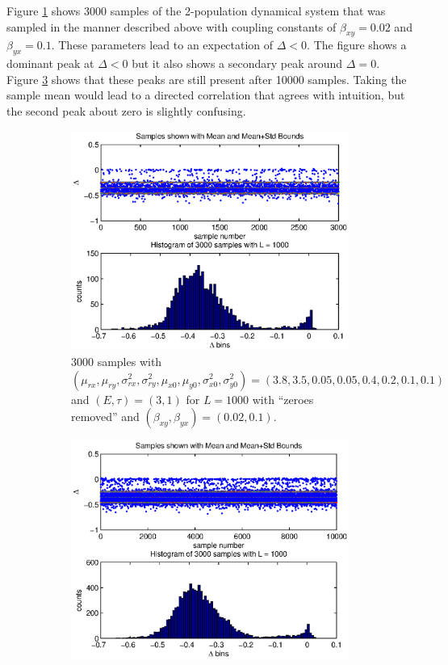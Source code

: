 \documentclass[a4paper,11pt]{article}
\begin{document}
Figure \ref{fig:TwoPopDynSampFig1} shows 3000 samples of the 2-population dynamical system that was sampled in the manner described above with coupling constants of $\beta_{xy}=0.02$ and $\beta_{yx}=0.1$.  These parameters lead to an expectation of $\Delta < 0$.  The figure shows a dominant peak at $\Delta < 0$ but it also shows a secondary peak around $\Delta=0$.  Figure \ref{fig:TwoPopDynSampFig1_10000} shows that these peaks are still present after 10000 samples.  Taking the sample mean would lead to a directed correlation that agrees with intuition, but the second peak about zero is slightly confusing.
\begin{figure}[h!t]
\centering
\begin{subfigure}[b]{0.4\textwidth}
\label{fig:TwoPopDynSampFig1}
\includegraphics[scale=0.55]{graphics/TwoPopDynSampFig1.eps}
\caption{3000 samples with $\left(\mu_{rx},\mu_{ry},\sigma^2_{rx},\sigma^2_{ry},\mu_{x0},\mu_{y0},\sigma^2_{x0},\sigma^2_{y0}\right) = \left(3.8,3.5,0.05,0.05,0.4,0.2,0.1,0.1\right)$ and $\left(E,\tau\right)=\left(3,1\right)$ for $L=1000$ with ``zeroes removed'' and $(\beta_{xy},\beta_{yx})=(0.02,0.1)$.}
\end{subfigure}
\begin{subfigure}[b]{0.4\textwidth}
\label{fig:TwoPopDynSampFig1_10000}
\includegraphics[scale=0.55]{graphics/TwoPopDynSampFig1_10000.eps}

\end{subfigure}
\end{figure}
\end{document}
